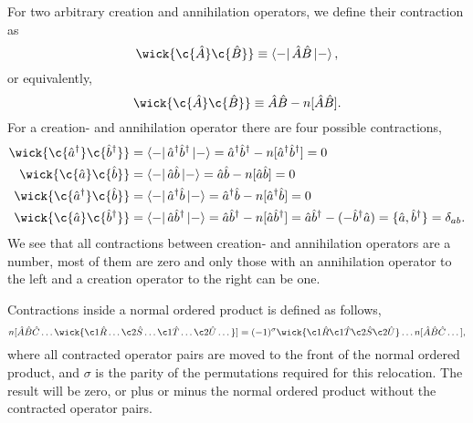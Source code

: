         For two arbitrary creation and annihilation operators, we define their contraction
        as 
        \begin{equation}
            \wick{\c {\hat{A}} \c {\hat{B}} } \equiv \bra{-} \hat{A} \hat{B}\ket{-},
        \end{equation}
        or equivalently,
        \begin{equation}
            \wick{\c {\hat{A}} \c {\hat{B}} } \equiv \hat{A}\hat{B} - n[\hat{A} \hat{B}].
        \end{equation}
        For a creation- and annihilation operator there are four possible contractions,
        \begin{equation}
            \begin{aligned}
            \wick{\c{\hat{a}^\dagger} \c{\hat{b}^\dagger}} 
            &= \bra{-}\hat{a}^\dagger \hat{b}^\dagger \ket{-}
            = \hat{a}^\dagger \hat{b}^\dagger - n[\hat{a}^\dagger \hat{b}^\dagger]
            = 0 \\
            \wick{\c{\hat{a}} \c{\hat{b}}} 
            &= \bra{-}\hat{a} \hat{b} \ket{-}
            = \hat{a} \hat{b} - n[\hat{a} \hat{b}]
            = 0 \\
            \wick{\c{\hat{a}^\dagger} \c{\hat{b}}} 
            &= \bra{-}\hat{a}^\dagger \hat{b} \ket{-}
            = \hat{a}^\dagger \hat{b} - n[\hat{a}^\dagger \hat{b}]
            = 0 \\
            \wick{\c{\hat{a}} \c{\hat{b}^\dagger}} 
            &= \bra{-}\hat{a} \hat{b}^\dagger \ket{-}
            = \hat{a} \hat{b}^\dagger - n[\hat{a} \hat{b}^\dagger]
            = \hat{a} \hat{b}^\dagger - (- \hat{b}^\dagger\hat{a})
            = \{\hat{a}, \hat{b}^\dagger \} = \delta_{ab}.
            \end{aligned}
        \end{equation}
        We see that all contractions between creation- and annihilation operators
        are a number, most of them are zero and only those with an annihilation operator
        to the left and a creation operator to the right can be one.
       
		Contractions inside a normal ordered product is defined as follows,
		\begin{equation}
			n[\hat{A}\hat{B}\hat{C} \dots 
			\wick{\c1{\hat{R}} \dots \c2{\hat{S}} \dots 
					\c1{\hat{T}} \dots \c2{\hat{U}} \dots}]
			= (-1)^{\sigma} \wick{\c1{\hat{R}} \c1{\hat{T}} \c2{\hat{S}} \c2{\hat{U}}}
				\dots n[\hat{A}\hat{B}\hat{C}\dots],
		\end{equation}
		where all contracted operator pairs are moved to the front of the normal ordered 
		product, and $\sigma$ is the parity of the permutations required for this relocation.
		The result will be zero, or plus or minus the normal ordered product without the
		contracted operator pairs.

